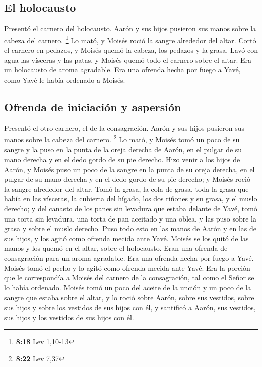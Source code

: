 \hypertarget{el-holocausto}{%
\subsection{El holocausto}\label{el-holocausto}}

 Presentó el carnero del holocausto. Aarón y sus hijos
pusieron sus manos sobre la cabeza del carnero. \footnote{\textbf{8:18}
  Lev 1,10-13}  Lo mató, y Moisés roció la sangre
alrededor del altar.  Cortó el carnero en pedazos, y
Moisés quemó la cabeza, los pedazos y la grasa.  Lavó con
agua las vísceras y las patas, y Moisés quemó todo el carnero sobre el
altar. Era un holocausto de aroma agradable. Era una ofrenda hecha por
fuego a Yavé, como Yavé le había ordenado a Moisés.

\hypertarget{ofrenda-de-iniciaciuxf3n-y-aspersiuxf3n}{%
\subsection{Ofrenda de iniciación y
aspersión}\label{ofrenda-de-iniciaciuxf3n-y-aspersiuxf3n}}

 Presentó el otro carnero, el de la consagración. Aarón y
sus hijos pusieron sus manos sobre la cabeza del carnero. \footnote{\textbf{8:22}
  Lev 7,37}  Lo mató, y Moisés tomó un poco de su sangre
y la puso en la punta de la oreja derecha de Aarón, en el pulgar de su
mano derecha y en el dedo gordo de su pie derecho.  Hizo
venir a los hijos de Aarón, y Moisés puso un poco de la sangre en la
punta de su oreja derecha, en el pulgar de su mano derecha y en el dedo
gordo de su pie derecho; y Moisés roció la sangre alrededor del altar.
 Tomó la grasa, la cola de grasa, toda la grasa que había
en las vísceras, la cubierta del hígado, los dos riñones y su grasa, y
el muslo derecho;  y del canasto de los panes sin
levadura que estaba delante de Yavé, tomó una torta sin levadura, una
torta de pan aceitado y una oblea, y las puso sobre la grasa y sobre el
muslo derecho.  Puso todo esto en las manos de Aarón y en
las de sus hijos, y los agitó como ofrenda mecida ante Yavé.
 Moisés se los quitó de las manos y los quemó en el
altar, sobre el holocausto. Eran una ofrenda de consagración para un
aroma agradable. Era una ofrenda hecha por fuego a Yavé. 
Moisés tomó el pecho y lo agitó como ofrenda mecida ante Yavé. Era la
porción que le correspondía a Moisés del carnero de la consagración, tal
como el Señor se lo había ordenado.  Moisés tomó un poco
del aceite de la unción y un poco de la sangre que estaba sobre el
altar, y lo roció sobre Aarón, sobre sus vestidos, sobre sus hijos y
sobre los vestidos de sus hijos con él, y santificó a Aarón, sus
vestidos, sus hijos y los vestidos de sus hijos con él.

